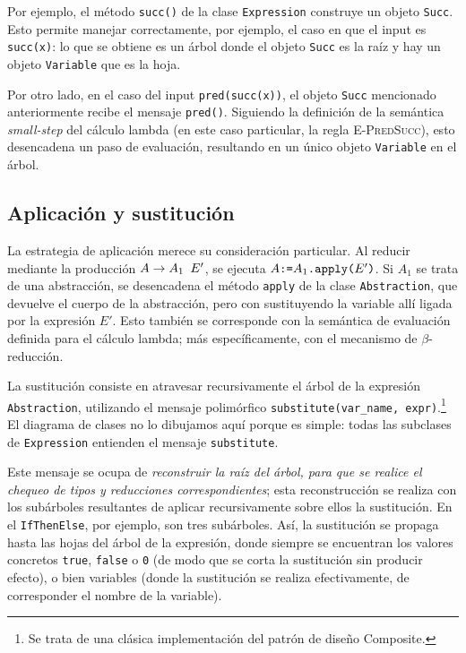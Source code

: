 \documentclass[11pt]{article}
\begin{document}
Por ejemplo, el método \lstinline|succ()| de la clase \lstinline|Expression| construye un objeto \lstinline|Succ|. Esto permite manejar correctamente, por ejemplo, el caso en que el input es \verb|succ(x)|: lo que se obtiene es un árbol donde el objeto \lstinline|Succ| es la raíz y hay un objeto \lstinline|Variable| que es la hoja.

Por otro lado, en el caso del input \verb|pred(succ(x))|, el objeto
\lstinline|Succ| mencionado anteriormente recibe el mensaje
\lstinline|pred()|. Siguiendo la definición de la semántica
\emph{small-step} del cálculo lambda (en este caso particular, la regla
\textsc{E-PredSucc}), esto desencadena un paso de evaluación, resultando en
un único objeto \lstinline|Variable| en el árbol.

\subsection{Aplicación y sustitución}

La estrategia de aplicación merece su consideración particular. Al reducir mediante la producción $A \rightarrow A_1 \verb| | E'$, se ejecuta $A \verb|:=| A_1\verb|.apply(|E'\verb|)|$. Si $A_1$ se trata de una abstracción, se desencadena el método \lstinline|apply| de la clase \lstinline|Abstraction|, que devuelve el cuerpo de la abstracción, pero con sustituyendo la variable allí ligada por la expresión $E'$. Esto también se corresponde con la semántica de evaluación definida para el cálculo lambda; más específicamente, con el mecanismo de $\beta$-reducción.

La sustitución consiste en atravesar recursivamente el árbol de la expresión \lstinline|Abstraction|, utilizando el mensaje polimórfico \lstinline|substitute(var_name, expr)|.\footnote{Se trata de una clásica implementación del patrón de diseño Composite.}
El diagrama de clases no lo dibujamos aquí porque es simple: todas las subclases de \lstinline|Expression| entienden el mensaje \lstinline|substitute|.

Este mensaje se ocupa de \emph{reconstruir la raíz del árbol, para que se realice el chequeo de tipos y reducciones correspondientes}; esta reconstrucción se realiza con los subárboles resultantes de aplicar recursivamente sobre ellos la sustitución. En el \lstinline|IfThenElse|, por ejemplo, son tres subárboles. Así, la sustitución se propaga hasta las hojas del árbol de la expresión, donde siempre se encuentran los valores concretos \verb|true|, \verb|false| o \verb|0| (de modo que se corta la sustitución sin producir efecto), o bien variables (donde la sustitución se realiza efectivamente, de corresponder el nombre de la variable).
\end{document}
